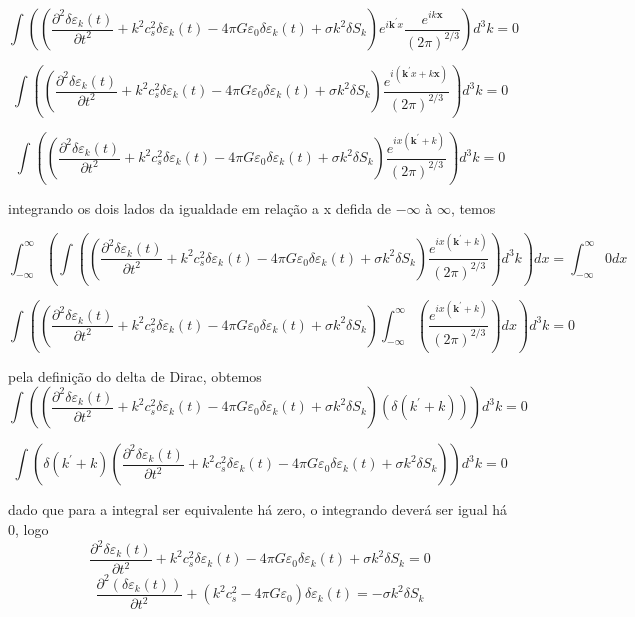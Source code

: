 \documentclass[a4paper,12pt]{article}
\begin{document}
$$\int \left(\left( \dfrac{\partial^2 \delta\varepsilon_k (t)}{\partial t^2}+ k^2c^2_s\delta\varepsilon_k (t)- 4\pi G\varepsilon_0\delta\varepsilon_k (t) + \sigma k^2\delta S_k\right)  e^{i\mathbf{k}^\prime x} \dfrac{e^{ik\textbf{x}}}{(2\pi)^{2/3}} \right)d^3 k  =0 $$

$$\int \left(\left( \dfrac{\partial^2 \delta\varepsilon_k (t)}{\partial t^2}+ k^2c^2_s\delta\varepsilon_k (t)- 4\pi G\varepsilon_0\delta\varepsilon_k (t) + \sigma k^2\delta S_k\right) \dfrac{e^{i(\mathbf{k}^\prime x+k\textbf{x})}}{(2\pi)^{2/3}} \right)d^3 k  =0 $$

$$\int \left(\left( \dfrac{\partial^2 \delta\varepsilon_k (t)}{\partial t^2}+ k^2c^2_s\delta\varepsilon_k (t)- 4\pi G\varepsilon_0\delta\varepsilon_k (t) + \sigma k^2\delta S_k\right) \dfrac{e^{ix(\mathbf{k}^\prime +k)}}{(2\pi)^{2/3}} \right)d^3 k  =0 $$

integrando os dois lados da igualdade em relação a x defida de $-\infty$ à $\infty$, temos

$$\int^{\infty}_{-\infty} \left( \int \left(\left( \dfrac{\partial^2 \delta\varepsilon_k (t)}{\partial t^2}+ k^2c^2_s\delta\varepsilon_k (t)- 4\pi G\varepsilon_0\delta\varepsilon_k (t) + \sigma k^2\delta S_k\right) \dfrac{e^{ix(\mathbf{k}^\prime +k)}}{(2\pi)^{2/3}} \right)d^3 k \right) dx  =\int^{\infty}_{-\infty}0dx $$

$$ \int \left(\left( \dfrac{\partial^2 \delta\varepsilon_k (t)}{\partial t^2}+ k^2c^2_s\delta\varepsilon_k (t)- 4\pi G\varepsilon_0\delta\varepsilon_k (t) + \sigma k^2\delta S_k\right) \int^{\infty}_{-\infty} \left(\dfrac{e^{ix(\mathbf{k}^\prime +k)}}{(2\pi)^{2/3}} \right)dx  \right)d^3 k  = 0 $$

pela definição do delta de Dirac,  obtemos
$$ \int \left(\left( \dfrac{\partial^2 \delta\varepsilon_k (t)}{\partial t^2}+ k^2c^2_s\delta\varepsilon_k (t)- 4\pi G\varepsilon_0\delta\varepsilon_k (t) + \sigma k^2\delta S_k\right) (\delta (k^\prime + k))  \right)d^3 k  = 0 $$

$$ \int \left(\delta (k^\prime + k)\left( \dfrac{\partial^2 \delta\varepsilon_k (t)}{\partial t^2}+ k^2c^2_s\delta\varepsilon_k (t)- 4\pi G\varepsilon_0\delta\varepsilon_k (t) + \sigma k^2\delta S_k\right)   \right)d^3 k  = 0 $$

dado que para a integral ser equivalente há zero, o integrando deverá ser igual há 0, logo
$$\dfrac{\partial^2 \delta\varepsilon_k (t)}{\partial t^2}+ k^2c^2_s\delta\varepsilon_k (t)- 4\pi G\varepsilon_0\delta\varepsilon_k (t) + \sigma k^2\delta S_k = 0 $$
\begin{equation}\label{eq30}
	\dfrac{\partial^2 (\delta\varepsilon_k (t))}{\partial t^2} +(k^2c^2_s - 4\pi G\varepsilon_0)\delta\varepsilon_k (t) = -\sigma k^2 \delta S_k
\end{equation} 
\end{document}
